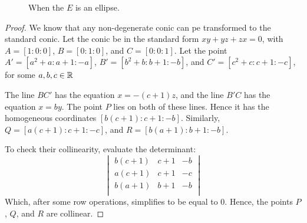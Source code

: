 \begin{figure}[H]
  \center
  \caption{When the $E$ is an ellipse.}
  \label{fig:pascal}
\end{figure}

\begin{proof}
  We know that any non-degenerate conic can pe transformed to the standard conic. Let the conic
  be in the standard form $xy+yz+zx=0$, with $A=[1:0:0]$, $B=[0:1:0]$, and $C=[0:0:1]$. Let the
  point $A'=[a^2+a:a+1:-a]$, $B'=[b^2+b:b+1:-b]$, and $C'=[c^2+c:c+1:-c]$, for some $a,b,c\in\mathbb{R}$

  The line $BC'$ has the equation $x=-(c+1)z$, and the line $B'C$ has the equation $x=by$. The
  point $P$ lies on both of these lines. Hence it has the homogeneous coordinates
  $[b(c+1):c+1:-b]$. Similarly, $Q=[a(c+1):c+1:-c]$, and $R=[b(a+1):b+1:-b]$.

  To check their collinearity, evaluate the determinant:
  \[
    \begin{vmatrix}
      b(c+1) & c+1 & -b \\
      a(c+1) & c+1 & -c \\
      b(a+1) & b+1 & -b \\
    \end{vmatrix}
  \]
  Which, after some row operations, simplifies to be equal to $0$.
  Hence, the points $P$, $Q$, and $R$ are collinear.
\end{proof}

